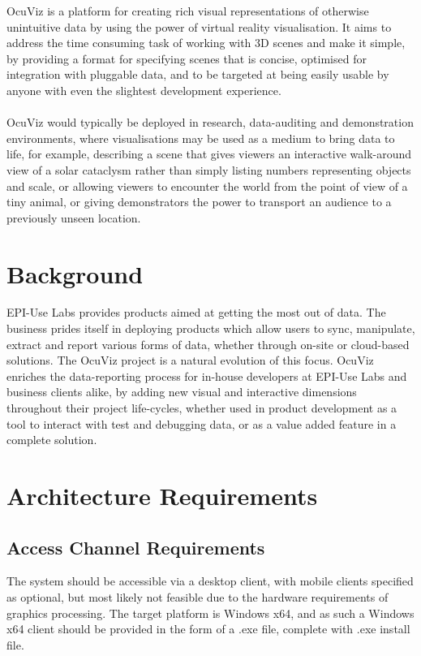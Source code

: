\documentclass[a4paper,12pt]{article}
\begin{document}
	OcuViz is a platform for creating rich visual representations of otherwise unintuitive data by using the power of virtual reality visualisation. It aims to address the time consuming task of working with 3D scenes and make it simple, by providing a format for specifying scenes that is concise, optimised for integration with pluggable data, and to be targeted at being easily usable by anyone with even the slightest development experience.\\\\
	OcuViz would typically be deployed in research, data-auditing and demonstration environments, where visualisations may be used as a medium to bring data to life, for example, describing a scene that gives viewers an interactive walk-around view of a solar cataclysm rather than simply listing numbers representing objects and scale, or allowing viewers to encounter the world from the point of view of a tiny animal, or giving demonstrators the power to transport an audience to a previously unseen location.
	
\section{Background}

	EPI-Use Labs provides products aimed at getting the most out of data. The business prides itself in deploying products which allow users to sync, manipulate, extract and report various forms of data, whether through on-site or cloud-based solutions. The OcuViz project is a natural evolution of this focus. OcuViz enriches the data-reporting process for in-house developers at EPI-Use Labs and business clients alike, by adding new visual and interactive dimensions throughout their project life-cycles, whether used in product development as a tool to interact with test and debugging data, or as a value added feature in a complete solution.

\newpage

\section{Architecture Requirements}

\subsection{Access Channel Requirements}
	
	The system should be accessible via a desktop client, with mobile clients specified as optional, but most likely not feasible due to the hardware requirements of graphics processing. The target platform is Windows x64, and as such a Windows x64 client should be provided in the form of a .exe file, complete with .exe install file.
\end{document}
